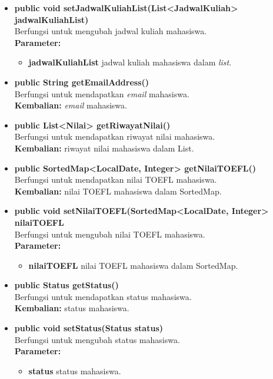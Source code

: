 \begin{itemize}
	\item \textbf{public void setJadwalKuliahList(List<JadwalKuliah> jadwalKuliahList)}\\
		Berfungsi untuk mengubah jadwal kuliah mahasiswa.\\
        \textbf{Parameter:}
		\begin{itemize}
			\item \textbf{jadwalKuliahList} jadwal kuliah mahasiswa dalam \textit{list}.
		\end{itemize}	
		
	\item \textbf{public String getEmailAddress()}\\
		Berfungsi untuk mendapatkan \textit{email} mahasiswa.\\
		\textbf{Kembalian:} \textit{email} mahasiswa.
	
	\item \textbf{public List<Nilai> getRiwayatNilai()}\\
		Berfungsi untuk mendapatkan riwayat nilai mahasiswa.\\
		\textbf{Kembalian:} riwayat nilai mahasiswa dalam List.
		
	\item \textbf{public SortedMap<LocalDate, Integer> getNilaiTOEFL()}\\
	Berfungsi untuk mendapatkan nilai TOEFL mahasiswa.\\
	\textbf{Kembalian:} nilai TOEFL mahasiswa dalam SortedMap.
	
	\item \textbf{public void setNilaiTOEFL(SortedMap<LocalDate, Integer> nilaiTOEFL}\\
	Berfungsi untuk mengubah nilai TOEFL mahasiswa.\\
    \textbf{Parameter:}
		\begin{itemize}
			\item \textbf{nilaiTOEFL} nilai TOEFL mahasiswa dalam SortedMap.
		\end{itemize}		
		
	\item \textbf{public Status getStatus()}\\
	Berfungsi untuk mendapatkan status mahasiswa.\\
	\textbf{Kembalian:} status mahasiswa.
	
	\item \textbf{public void setStatus(Status status)}\\
	Berfungsi untuk mengubah status mahasiswa.\\
        \textbf{Parameter:}
		\begin{itemize}
			\item \textbf{status} status mahasiswa.
		\end{itemize}	
		

\end{itemize}
